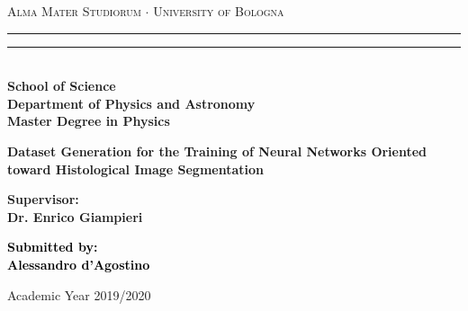 \begin{titlepage}
\begin{center}
{{\Large{\textsc{Alma Mater Studiorum $\cdot$ University of  Bologna}}}}
\rule[0.1cm]{15.8cm}{0.1mm}
\rule[0.5cm]{15.8cm}{0.6mm}
\\\vspace{3mm}
{\small{\bf School of Science \\
Department of Physics and Astronomy\\
Master Degree in Physics}}
\end{center}

\vspace{23mm}

\begin{center}
    \LARGE{\bf Dataset Generation for the Training of Neural Networks Oriented toward Histological Image Segmentation}\\
\end{center}

\vspace{50mm} \par \noindent

\begin{minipage}[t]{0.47\textwidth}
{\large{\bf Supervisor: \vspace{2mm}\\
Dr. Enrico Giampieri}}
\end{minipage}
%
\hfill
%
\begin{minipage}[t]{0.47\textwidth}\raggedleft
    \textcolor{black}{
        {\large{\bf Submitted by:
            \vspace{2mm}\\
            {Alessandro d'Agostino}}}
    }
\end{minipage}

\vspace{40mm}

\begin{center}
Academic Year 2019/2020
\end{center}
\end{titlepage}
